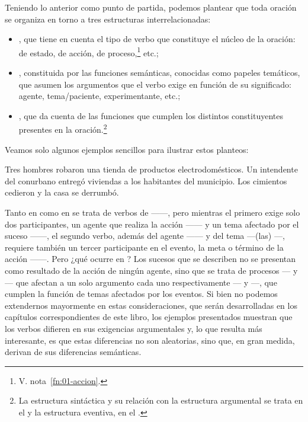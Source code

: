 Teniendo lo anterior como punto de partida, podemos plantear que toda oración
se organiza en torno a tres estructuras interrelacionadas:

\begin{itemize}
  \item {}, que tiene en cuenta el tipo de verbo
        que constituye el núcleo de la oración: de estado, de acción, de
        proceso,\footnote{V. nota~\ref{fn:01-accion}.} etc.;
  \item {}, constituida por las funciones
        semánticas, conocidas como papeles temáticos, que asumen los argumentos
        que el verbo exige en función de su significado: agente, tema/paciente,
        experimentante, etc.;
  \item {}, que da cuenta de las funciones que
        cumplen los distintos constituyentes presentes en la
        oración.\footnote{La estructura sintáctica y su relación con la
        estructura argumental se trata en el  y la estructura
        eventiva, en el .}
\end{itemize}

Veamos solo algunos ejemplos sencillos para ilustrar estos planteos:

\begin{exe}
  \ex\label{ex:01-argumentos}
    \begin{xlist}
      \ex\label{ex:01-argumentos-a} Tres hombres robaron una tienda de productos electrodomésticos.
      \ex\label{ex:01-argumentos-b} Un intendente del conurbano entregó viviendas a los habitantes del municipio.
      \ex\label{ex:01-argumentos-c} Los cimientos cedieron y la casa se derrumbó.
    \end{xlist}
\end{exe}

Tanto en  como en  se trata
de verbos de  ------, pero mientras el
primero exige solo dos participantes, un agente que realiza la acción
------ y un tema afectado por el suceso ------, el segundo verbo, además del agente
------ y del tema ---(las)
---, requiere también un tercer participante en el evento, la
meta o término de la acción ------. Pero
¿qué ocurre en ? Los sucesos que se describen no se
presentan como resultado de la acción de ningún agente, sino que se trata de
procesos --- y --- que afectan a un solo
argumento cada uno respectivamente --- y ---, que cumplen la función de temas afectados por los eventos. Si bien no
podemos extendernos mayormente en estas consideraciones, que serán desarrolladas
en los capítulos correspondientes de este libro, los ejemplos presentados
muestran que los verbos difieren en sus exigencias argumentales y, lo que
resulta más interesante, es que estas diferencias no son aleatorias, sino que,
en gran medida, derivan de sus diferencias semánticas.

